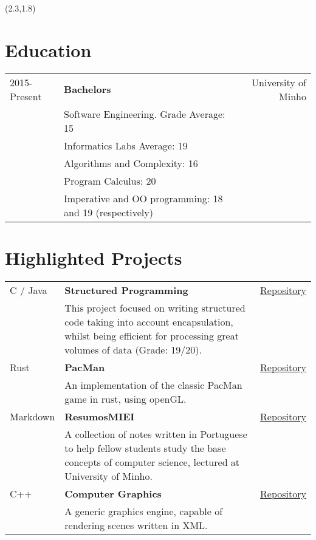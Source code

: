 \documentclass{article}
\begin{document}
\begin{textblock}{7.3} (2.3,1.8)

    \section{Education}
    \begin{tabular}{lp{8.4cm}r}
        2015-Present & \textbf{Bachelors} & University of Minho\\
        & Software Engineering. Grade Average: 15 &\\
        & Informatics Labs Average: 19 & \\
        & Algorithms and Complexity: 16 & \\
        & Program Calculus: 20 & \\
        & Imperative and OO programming: 18 and 19 (respectively) &\\
    \end{tabular}
    \section{Highlighted Projects}
    \begin{tabular}{lp{10.4cm}r}
        C / Java & \textbf{Structured Programming} & \href{https://github.com/Mendess2526/LI3_StructuredPrograming}{Repository}\\
        & This project focused on writing structured code taking into account
        encapsulation, whilst being efficient for processing great volumes of
        data (Grade: 19/20). &\\
        Rust & \textbf{PacMan} & \href{https://github.com/Mendess2526/rust-pacman}{Repository}\\
        & An implementation of the classic PacMan game in rust, using openGL. &\\
        Markdown & \textbf{ResumosMIEI} & \href{https://github.com/Mendess2526/ResumosMIEI}{Repository}\\
        & A collection of notes written in Portuguese to help fellow students
        study the base concepts of computer science, lectured at University of
        Minho. &\\
        C++ & \textbf{Computer Graphics} & \href{https://github.com/Mendess2526/CG}{Repository}\\
        & A generic graphics engine, capable of rendering scenes written in XML\@. &\\
    \end{tabular}


\end{textblock}
\end{document}
